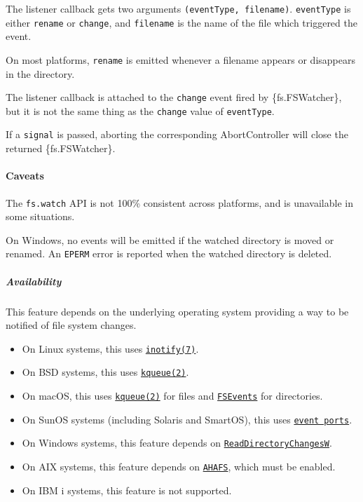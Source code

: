 The listener callback gets two arguments
\texttt{(eventType,\ filename)}. \texttt{eventType} is either
\texttt{\textquotesingle{}rename\textquotesingle{}} or
\texttt{\textquotesingle{}change\textquotesingle{}}, and
\texttt{filename} is the name of the file which triggered the event.

On most platforms, \texttt{\textquotesingle{}rename\textquotesingle{}}
is emitted whenever a filename appears or disappears in the directory.

The listener callback is attached to the
\texttt{\textquotesingle{}change\textquotesingle{}} event fired by
\{fs.FSWatcher\}, but it is not the same thing as the
\texttt{\textquotesingle{}change\textquotesingle{}} value of
\texttt{eventType}.

If a \texttt{signal} is passed, aborting the corresponding
AbortController will close the returned \{fs.FSWatcher\}.

\paragraph{Caveats}\label{caveats}

The \texttt{fs.watch} API is not 100\% consistent across platforms, and
is unavailable in some situations.

On Windows, no events will be emitted if the watched directory is moved
or renamed. An \texttt{EPERM} error is reported when the watched
directory is deleted.

\subparagraph{Availability}\label{availability}

This feature depends on the underlying operating system providing a way
to be notified of file system changes.

\begin{itemize}
\tightlist
\item
  On Linux systems, this uses
  \href{https://man7.org/linux/man-pages/man7/inotify.7.html}{\texttt{inotify(7)}}.
\item
  On BSD systems, this uses
  \href{https://www.freebsd.org/cgi/man.cgi?query=kqueue&sektion=2}{\texttt{kqueue(2)}}.
\item
  On macOS, this uses
  \href{https://www.freebsd.org/cgi/man.cgi?query=kqueue&sektion=2}{\texttt{kqueue(2)}}
  for files and
  \href{https://developer.apple.com/documentation/coreservices/file_system_events}{\texttt{FSEvents}}
  for directories.
\item
  On SunOS systems (including Solaris and SmartOS), this uses
  \href{https://illumos.org/man/port_create}{\texttt{event\ ports}}.
\item
  On Windows systems, this feature depends on
  \href{https://docs.microsoft.com/en-us/windows/desktop/api/winbase/nf-winbase-readdirectorychangesw}{\texttt{ReadDirectoryChangesW}}.
\item
  On AIX systems, this feature depends on
  \href{https://developer.ibm.com/articles/au-aix_event_infrastructure/}{\texttt{AHAFS}},
  which must be enabled.
\item
  On IBM i systems, this feature is not supported.
\end{itemize}

